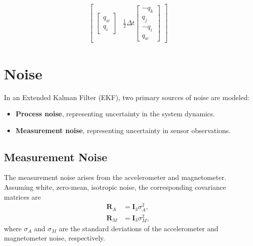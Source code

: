 \documentclass[10pt,a4paper]{article}
\begin{document}
\begin{align}
\begin{bmatrix}
\begin{bmatrix}
                                                                   q_w \\
                                                                   q_i
                                                                 \end{bmatrix} &
                                                                                 \frac 1 2 \Delta t
                                                                                 \begin{bmatrix}
                                                                                   - q_k \\
                                                                                    q_j \\
                                                                                   - q_i \\
                                                                                    q_w
                                                                                 \end{bmatrix} 
                                               \end{bmatrix}
\end{align}

\section{Noise}

In an Extended Kalman Filter (EKF), two primary sources of noise are modeled:
\begin{itemize}
  \item \textbf{Process noise}, representing uncertainty in the system dynamics.
  \item \textbf{Measurement noise}, representing uncertainty in sensor observations.
\end{itemize}

\subsection{Measurement Noise}

The measurement noise arises from the accelerometer and magnetometer.  
Assuming white, zero-mean, isotropic noise, the corresponding covariance matrices are
\begin{align}
  \mathbf{R}_A &= \mathbf{I}_3 \sigma_A^2, \\
  \mathbf{R}_M &= \mathbf{I}_3 \sigma_M^2,
\end{align}
where $\sigma_A$ and $\sigma_M$ are the standard deviations of the accelerometer and magnetometer noise, respectively.
\end{document}
